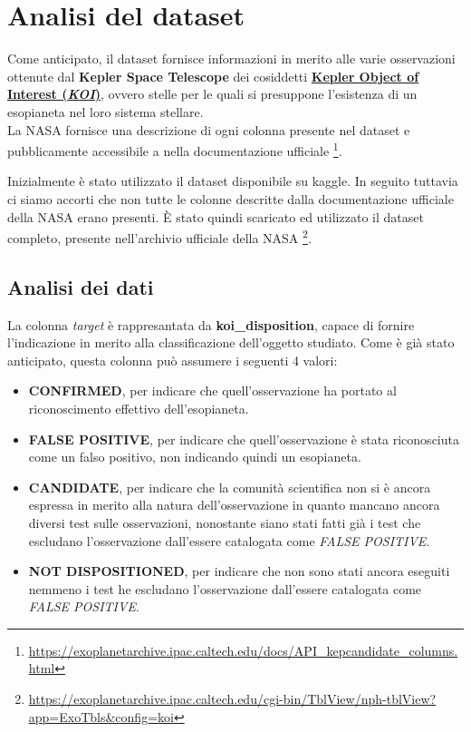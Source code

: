 \chapter{Analisi del dataset}
Come anticipato, il dataset fornisce informazioni in merito alle varie 
osservazioni ottenute dal \textbf{Kepler Space Telescope} dei cosiddetti
\href{https://en.wikipedia.org/wiki/Kepler_object_of_interest}
{\textbf{Kepler Object of Interest (\textit{KOI})}}, ovvero stelle per le quali
si presuppone l'esistenza di un esopianeta nel loro sistema stellare.\\

La NASA fornisce una descrizione di ogni colonna presente nel dataset e 
pubblicamente accessibile a nella documentazione ufficiale
\footnote{\href{https://exoplanetarchive.ipac.caltech.edu/docs/API_kepcandidate_columns.html}
{https://exoplanetarchive.ipac.caltech.edu/docs/API\_kepcandidate\_columns.html}}.

Inizialmente è stato utilizzato il dataset disponibile su kaggle. In seguito tuttavia ci 
siamo accorti che non tutte le colonne descritte dalla documentazione ufficiale della NASA erano presenti. 
È stato quindi scaricato ed utilizzato il dataset completo, presente nell'archivio ufficiale della NASA
\footnote{\href{https://exoplanetarchive.ipac.caltech.edu/cgi-bin/TblView/nph-tblView?app=ExoTbls&config=koi}
{https://exoplanetarchive.ipac.caltech.edu/cgi-bin/TblView/nph-tblView?app=ExoTbls\&config=koi}}.


\section{Analisi dei dati}

La colonna \textit{target} è rappresantata da \textbf{koi\_disposition}, 
capace di fornire l'indicazione in merito alla classificazione dell'oggetto studiato.
Come è già stato anticipato, questa colonna può assumere i seguenti 4 valori: 
\begin{itemize}
    \item \textbf{CONFIRMED}, per indicare che quell'osservazione ha portato al 
    riconoscimento effettivo dell'esopianeta.
    \item \textbf{FALSE POSITIVE}, per indicare che quell'osservazione è stata 
    riconosciuta come un falso positivo, non indicando quindi un esopianeta.
    \item \textbf{CANDIDATE}, per indicare che la comunità scientifica non si 
    è ancora espressa in merito alla natura dell'osservazione in quanto mancano
    ancora diversi test sulle osservazioni, nonostante siano stati fatti già
    i test che escludano l'osservazione dall'essere catalogata come 
    \textit{FALSE POSITIVE}.
    \item \textbf{NOT DISPOSITIONED}, per indicare che non sono stati ancora 
    eseguiti nemmeno i test he escludano l'osservazione dall'essere catalogata 
    come \textit{FALSE POSITIVE}.
\end{itemize}

